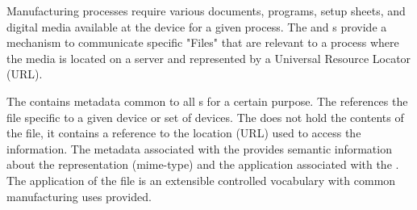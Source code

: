 Manufacturing processes require various documents, programs, setup sheets, and digital media available at the device for a given process. The  and  s provide a mechanism to communicate specific "Files" that are relevant to a process where the media is located on a server and represented by a Universal Resource Locator (URL).

The  contains metadata common to all  s for a certain purpose. The   references the file specific to a given device or set of devices. The   does not hold the contents of the file, it contains a reference to the location (URL) used to access the information. The metadata associated with the  provides semantic information about the representation (mime-type) and the application associated with the . The application of the file is an extensible controlled vocabulary with common manufacturing uses provided.


